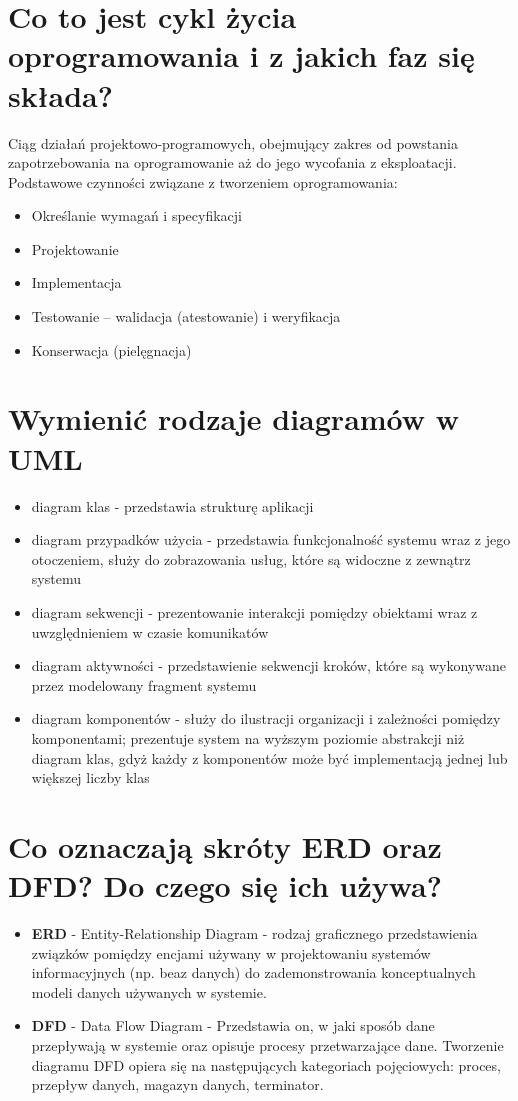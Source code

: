 \documentclass[12pt,a4paper]{article}
\begin{document}
	\section{Co to jest cykl życia oprogramowania i z jakich faz się składa?}
	Ciąg działań projektowo-programowych, obejmujący zakres od powstania zapotrzebowania na oprogramowanie aż do jego wycofania z eksploatacji. Podstawowe czynności związane z tworzeniem oprogramowania:
	\begin{itemize}
		\item Określanie wymagań i specyfikacji
		\item Projektowanie
		\item Implementacja
		\item Testowanie – walidacja (atestowanie) i weryfikacja
		\item Konserwacja (pielęgnacja)
	\end{itemize}

	\section{Wymienić rodzaje diagramów w UML}
	\begin{itemize}
		\item diagram klas - przedstawia strukturę aplikacji
		\item diagram przypadków użycia - przedstawia funkcjonalność systemu wraz z jego otoczeniem, służy do zobrazowania usług, które są widoczne z zewnątrz systemu
		\item diagram sekwencji - prezentowanie interakcji pomiędzy obiektami wraz z uwzględnieniem w czasie komunikatów
		\item diagram aktywności - przedstawienie sekwencji kroków, które są wykonywane przez modelowany fragment systemu
		\item diagram komponentów - służy do ilustracji organizacji i zależności pomiędzy komponentami; prezentuje system na wyższym poziomie abstrakcji niż diagram klas, gdyż każdy z komponentów może być implementacją jednej lub większej liczby klas
	\end{itemize}

	\section{Co oznaczają skróty ERD oraz DFD? Do czego się ich używa?}
	\begin{itemize}
		\item \textbf{ERD} - Entity-Relationship Diagram - rodzaj graficznego przedstawienia związków pomiędzy encjami używany w projektowaniu systemów informacyjnych (np. beaz danych) do zademonstrowania konceptualnych modeli danych używanych w systemie.
		\item \textbf{DFD} - Data Flow Diagram - Przedstawia on, w jaki sposób dane przepływają w systemie oraz opisuje procesy przetwarzające dane. Tworzenie diagramu DFD opiera się na następujących kategoriach pojęciowych: proces, przepływ danych, magazyn danych, terminator.
	\end{itemize}
\end{document}
